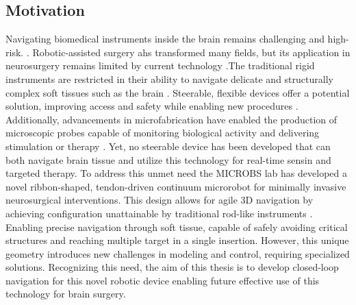 



\subsection{Motivation}

Navigating biomedical instruments inside the brain remains challenging and high-risk. . Robotic-assisted surgery ahs transformed many fields, but its application in neurosurgery remains limited by current technology \cite{doulgeris_robotics_2015}.The traditional rigid instruments are restricted in their ability to navigate delicate and structurally complex soft tissues such as the brain \cite{noseda_flat_2024}. Steerable, flexible devices offer a potential solution, improving access and safety while enabling new procedures \cite{da_veiga_challenges_2020}. Additionally, advancements in microfabrication have enabled the production of microscopic probes capable of monitoring biological activity and delivering stimulation or therapy \cite{chen_neural_2017} \cite{frank_next-generation_2019}. Yet, no steerable device has been developed that can both navigate brain tissue and utilize this technology for real-time sensin and targeted therapy. 
\newline \newline
To address this unmet need the MICROBS lab has developed a novel ribbon-shaped, tendon-driven continuum microrobot for minimally invasive neurosurgical interventions. This design allows for agile 3D navigation by achieving configuration unattainable by traditional rod-like instruments \cite{noseda_flat_2024}. Enabling precise navigation through soft tissue, capable of safely avoiding critical structures and reaching multiple target in a single insertion. However, this unique geometry introduces new challenges in modeling and control, requiring specialized solutions. Recognizing this need, the aim of this thesis is to develop closed-loop navigation for this novel robotic device enabling future effective use of this technology for brain surgery. 





